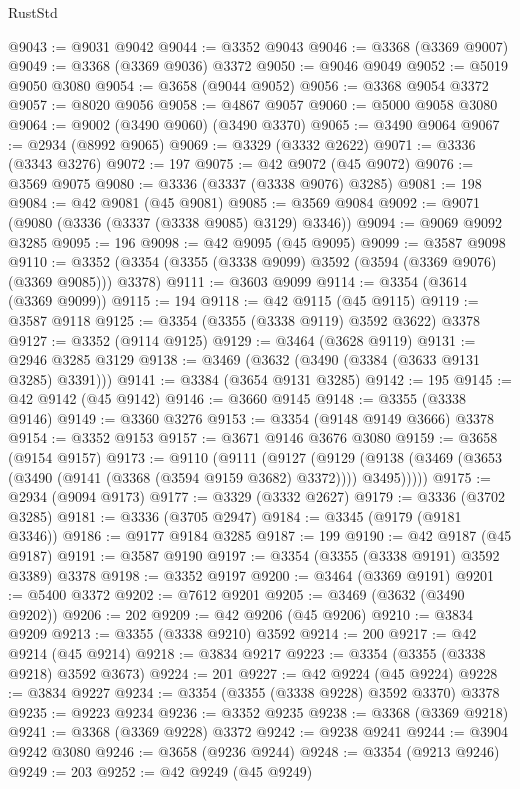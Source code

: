 \begin{lexlean}{RustStd}
\begin{coremodule}
@9043 := @9031 @9042
@9044 := @3352 @9043
@9046 := @3368 (@3369 @9007)
@9049 := @3368 (@3369 @9036) @3372
@9050 := @9046 @9049
@9052 := @5019 @9050 @3080
@9054 := @3658 (@9044 @9052)
@9056 := @3368 @9054 @3372
@9057 := @8020 @9056
@9058 := @4867 @9057
@9060 := @5000 @9058 @3080
@9064 := @9002 (@3490 @9060) (@3490 @3370)
@9065 := @3490 @9064
@9067 := @2934 (@8992 @9065)
@9069 := @3329 (@3332 @2622)
@9071 := @3336 (@3343 @3276)
@9072 := 197
@9075 := @42 @9072 (@45 @9072)
@9076 := @3569 @9075
@9080 := @3336 (@3337 (@3338 @9076) @3285)
@9081 := 198
@9084 := @42 @9081 (@45 @9081)
@9085 := @3569 @9084
@9092 := @9071 (@9080 (@3336 (@3337 (@3338 @9085) @3129) @3346))
@9094 := @9069 @9092 @3285
@9095 := 196
@9098 := @42 @9095 (@45 @9095)
@9099 := @3587 @9098
@9110 := @3352 (@3354 (@3355 (@3338 @9099) @3592 (@3594 (@3369 @9076) (@3369 @9085))) @3378)
@9111 := @3603 @9099
@9114 := @3354 (@3614 (@3369 @9099))
@9115 := 194
@9118 := @42 @9115 (@45 @9115)
@9119 := @3587 @9118
@9125 := @3354 (@3355 (@3338 @9119) @3592 @3622) @3378
@9127 := @3352 (@9114 @9125)
@9129 := @3464 (@3628 @9119)
@9131 := @2946 @3285 @3129
@9138 := @3469 (@3632 (@3490 (@3384 (@3633 @9131 @3285) @3391)))
@9141 := @3384 (@3654 @9131 @3285)
@9142 := 195
@9145 := @42 @9142 (@45 @9142)
@9146 := @3660 @9145
@9148 := @3355 (@3338 @9146)
@9149 := @3360 @3276
@9153 := @3354 (@9148 @9149 @3666) @3378
@9154 := @3352 @9153
@9157 := @3671 @9146 @3676 @3080
@9159 := @3658 (@9154 @9157)
@9173 := @9110
    (@9111
      (@9127
        (@9129 (@9138 (@3469 (@3653 (@3490 (@9141 (@3368 (@3594 @9159 @3682) @3372)))) @3495)))))
@9175 := @2934 (@9094 @9173)
@9177 := @3329 (@3332 @2627)
@9179 := @3336 (@3702 @3285)
@9181 := @3336 (@3705 @2947)
@9184 := @3345 (@9179 (@9181 @3346))
@9186 := @9177 @9184 @3285
@9187 := 199
@9190 := @42 @9187 (@45 @9187)
@9191 := @3587 @9190
@9197 := @3354 (@3355 (@3338 @9191) @3592 @3389) @3378
@9198 := @3352 @9197
@9200 := @3464 (@3369 @9191)
@9201 := @5400 @3372
@9202 := @7612 @9201
@9205 := @3469 (@3632 (@3490 @9202))
@9206 := 202
@9209 := @42 @9206 (@45 @9206)
@9210 := @3834 @9209
@9213 := @3355 (@3338 @9210) @3592
@9214 := 200
@9217 := @42 @9214 (@45 @9214)
@9218 := @3834 @9217
@9223 := @3354 (@3355 (@3338 @9218) @3592 @3673)
@9224 := 201
@9227 := @42 @9224 (@45 @9224)
@9228 := @3834 @9227
@9234 := @3354 (@3355 (@3338 @9228) @3592 @3370) @3378
@9235 := @9223 @9234
@9236 := @3352 @9235
@9238 := @3368 (@3369 @9218)
@9241 := @3368 (@3369 @9228) @3372
@9242 := @9238 @9241
@9244 := @3904 @9242 @3080
@9246 := @3658 (@9236 @9244)
@9248 := @3354 (@9213 @9246)
@9249 := 203
@9252 := @42 @9249 (@45 @9249)

\end{coremodule}
\end{lexlean}
